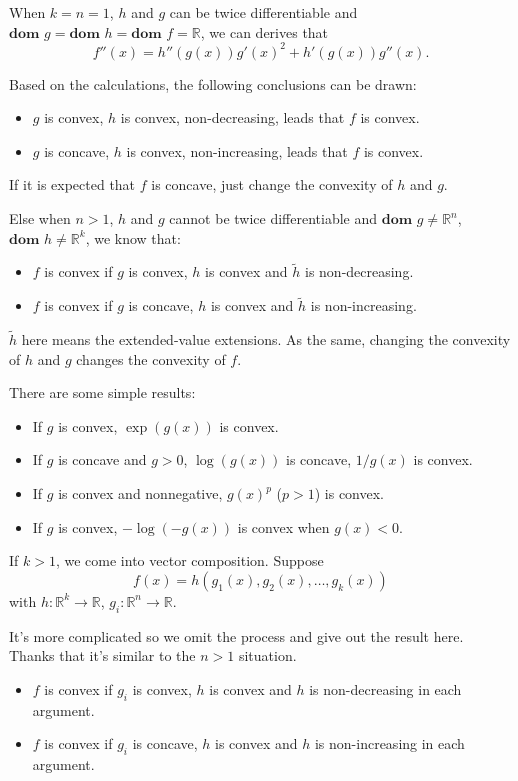 \documentclass[lang=en,color=blue,mode=fancy,titlestyle=hang]{elegantbook}
\begin{document}
When $k = n = 1$, $h$ and $g$ can be twice differentiable and
$\textbf{dom } g = \textbf{dom } h = \textbf{dom } f = \mathbb{R}$, we can derives that
\[
f''(x) = h''(g(x)){g'(x)}^2 + h'(g(x))g''(x).
\]

Based on the calculations, the following conclusions can be drawn:
\begin{itemize}
  \item $g$ is convex, $h$ is convex, non-decreasing, leads that $f$ is convex.
  \item $g$ is concave, $h$ is convex, non-increasing, leads that $f$ is convex.
\end{itemize}
If it is expected that $f$ is concave, just change the convexity of $h$ and $g$.

Else when $n > 1$, $h$ and $g$ cannot be twice differentiable and
$\textbf{dom } g \neq \mathbb{R}^n$, $\textbf{dom } h \neq \mathbb{R}^k$, we know that:
\begin{itemize}
  \item $f$ is convex if $g$ is convex, $h$ is convex and $\tilde{h}$ is non-decreasing.
  \item $f$ is convex if $g$ is concave, $h$ is convex and $\tilde{h}$ is non-increasing.
\end{itemize}
$\tilde{h}$ here means the extended-value extensions. As the same, changing the convexity of
$h$ and $g$ changes the convexity of $f$.

There are some simple results:
\begin{itemize}
  \item If $g$ is convex, $\exp(g(x))$ is convex.
  \item If $g$ is concave and $g > 0$, $\log(g(x))$ is concave, $1/g(x)$ is convex.
  \item If $g$ is convex and nonnegative, $g(x)^p$ ($p > 1$) is convex.
  \item If $g$ is convex, $-\log(-g(x))$ is convex when $g(x) < 0$.
\end{itemize}

If $k > 1$, we come into vector composition. Suppose
\[
f(x) = h(g_1(x), g_2(x), \ldots, g_k(x))
\]
with $h: \mathbb{R}^k \rightarrow \mathbb{R}$, $g_i: \mathbb{R}^n \rightarrow \mathbb{R}$.

It's more complicated so we omit the process and give out the result here. Thanks that
it's similar to the $n > 1$ situation.

\begin{itemize}
  \item $f$ is convex if $g_i$ is convex, $h$ is convex and $h$ is non-decreasing
  in each argument.
  \item $f$ is convex if $g_i$ is concave, $h$ is convex and $h$ is non-increasing
  in each argument.
\end{itemize}
\end{document}
